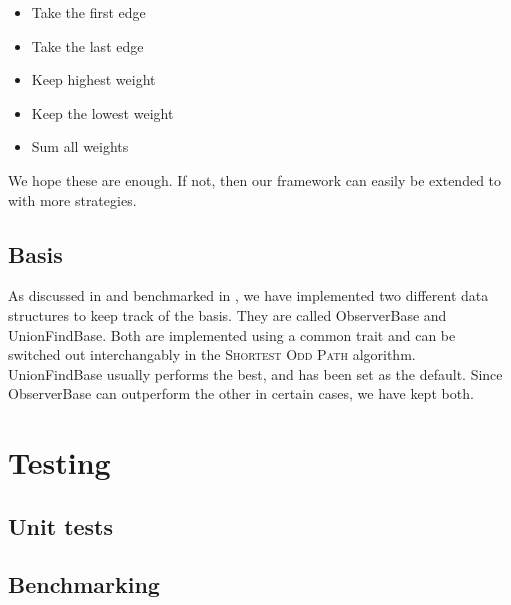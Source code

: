 \begin{itemize}
    \item Take the first edge
    \item Take the last edge
    \item Keep highest weight
    \item Keep the lowest weight
    \item Sum all weights
\end{itemize}

We hope these are enough. If not, then our framework can easily be extended to with more strategies.

\subsection{Basis}
As discussed in  and benchmarked in , we have implemented two different data structures to keep track of the basis. They are called ObserverBase and UnionFindBase. Both are implemented using a common trait and can be switched out interchangably in the \textsc{Shortest Odd Path} algorithm. UnionFindBase usually performs the best, and has been set as the default. Since ObserverBase can outperform the other in certain cases, we have kept both.

\section{Testing}
\subsection{Unit tests}

\subsection{Benchmarking}

